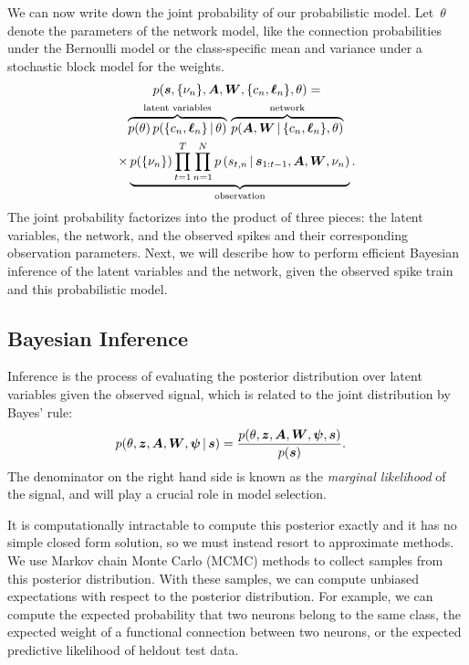 We can now write down the joint probability of our probabilistic model.
Let~$\theta$ denote the parameters of the network model, like the connection
probabilities under the Bernoulli model or the class-specific mean and variance
under a stochastic block model for the weights. 
\begin{multline}
p(\boldsymbol{s}, \{\nu_n\}, \boldsymbol{A}, \boldsymbol{W}, \{c_n, \boldsymbol{\ell}_n\}, \theta) 
=  \\
\overbrace{p(\theta) \, p(\{c_n, \boldsymbol{\ell}_n\} \,|\, \theta)}^\text{latent variables} \, 
\overbrace{p(\boldsymbol{A}, \boldsymbol{W} \,|\, \{c_n, \boldsymbol{\ell}_n\}, \theta)}^\text{network} \, \\
\times \underbrace{ p(\{\nu_n\}) \prod_{t=1}^T  \prod_{n=1}^N  p \left(s_{t,n} \,|\, \boldsymbol{s}_{1:t-1}, \boldsymbol{A}, \boldsymbol{W}, \nu_n \right) }_\text{observation} .
\end{multline}
The joint probability
factorizes into the product of three pieces: the latent variables, the network, and the observed spikes and their corresponding observation parameters. Next, we will describe
how to perform efficient Bayesian inference of the latent variables
and the network, given the observed spike train and this probabilistic model.

\subsection{Bayesian Inference}
Inference is the process of evaluating the posterior distribution over latent variables given the observed signal, which is related to the joint distribution by Bayes' rule:
\begin{align}
p(\theta, \boldsymbol{z}, \boldsymbol{A}, \boldsymbol{W}, \boldsymbol{\psi} \,|\, \boldsymbol{s}) &= \frac{p(\theta, \boldsymbol{z}, \boldsymbol{A}, \boldsymbol{W}, \boldsymbol{\psi}, \boldsymbol{s}) }{p(\boldsymbol{s})}.
\end{align}
The denominator on the right hand side is known as the \emph{marginal likelihood} of the signal, and will play a crucial role in model selection. 

It is computationally intractable to compute this posterior exactly and it has no simple closed form solution, so we must instead resort to approximate methods. 
We use Markov chain Monte Carlo (MCMC) methods to collect samples from this posterior distribution.
With these samples, we can compute unbiased expectations with respect to the posterior distribution.
For example, we can compute the expected probability that two neurons belong to the same class, the expected weight of a functional connection between two neurons, or the expected predictive likelihood of heldout test data.

